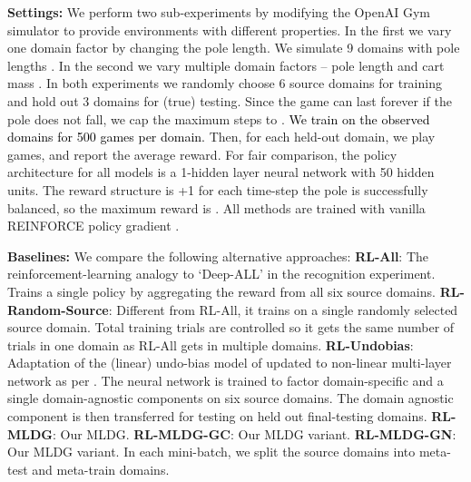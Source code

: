 \documentclass[letterpaper]{article} \usepackage{aaai18}  \usepackage{times}  \usepackage{helvet}  \usepackage{courier}  \usepackage{url}  \usepackage{graphicx}  \usepackage{amsmath}
\newcommand{\keypoint}[1]{\vspace{0.1cm}\noindent\textbf{#1}\quad}
\begin{document}
{\keypoint{Settings:} We perform two sub-experiments by modifying the OpenAI Gym simulator to provide environments with different properties. In the first we vary one domain factor by changing the pole length. We simulate 9 domains with pole lengths .  In the second we vary multiple domain factors -- pole length  and cart mass . In both experiments we randomly choose 6 source domains for training and hold out 3 domains for (true) testing. Since the game can last forever if the pole does not fall, we cap the maximum steps to . \textcolor{black}{We train on the observed domains for 500 games per domain.}
Then, for each held-out domain, we play  games, and report the average reward. For fair comparison, the policy architecture for all models is a 1-hidden layer neural network with 50 hidden units. The reward structure is +1 for each time-step the pole is successfully balanced, so the maximum reward is . All methods are trained with vanilla REINFORCE policy gradient \cite{williams1992reinforce}. 

\keypoint{Baselines:} We compare the following alternative approaches:  \textbf{RL-All}: The reinforcement-learning analogy to `Deep-ALL' in the recognition experiment. Trains a single policy by aggregating the reward from all six source domains. \textbf{RL-Random-Source}: Different from RL-All, it trains on a single randomly selected source domain. Total training trials are controlled so it gets the same number of trials in one domain as RL-All gets in multiple domains.
\textbf{RL-Undobias}: Adaptation of the (linear) undo-bias model of \cite{khosla2012undoing} updated to non-linear multi-layer network as per \cite{da2017dg}. The neural network is trained to factor domain-specific and a single domain-agnostic components on six source domains. The domain agnostic component is then transferred for testing on held out final-testing domains. \textbf{RL-MLDG}: Our  MLDG. \textbf{RL-MLDG-GC}: Our MLDG variant. \textbf{RL-MLDG-GN}: Our MLDG variant.  In each mini-batch, we split the  source domains into  meta-test  and  meta-train domains.

\begin{table}[t]
\centering
\caption{Cart-Pole RL. Domain generalisation performance across pole length. Average reward testing on 3 held out domains with random lengths. Upper bound: 200.}
\label{rl}
\end{table}







}
\end{document}
